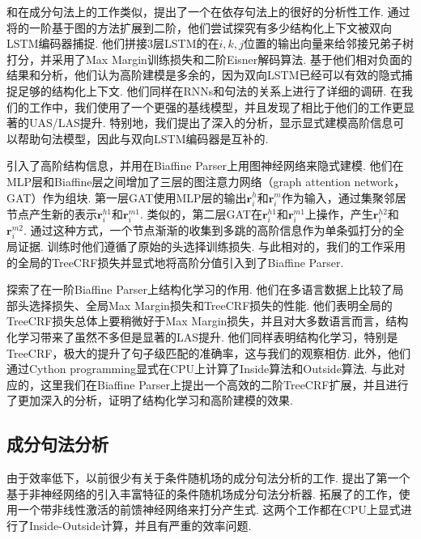 和\citet{gaddy-etal-2018-whats}在成分句法上的工作类似，\citet{falenska-kuhn-2019-non}提出了一个在依存句法上的很好的分析性工作.
通过将\citet{kiperwasser-goldberg-2016-simple}的一阶基于图的方法扩展到二阶，他们尝试探究有多少结构化上下文被双向LSTM编码器捕捉.
他们拼接3层LSTM的在$i,k,j$位置的输出向量来给邻接兄弟子树打分，并采用了Max Margin训练损失和二阶Eisner解码算法\citep{mcdonald-pereira-2006-online}.
基于他们相对负面的结果和分析，他们认为高阶建模是多余的，因为双向LSTM已经可以有效的隐式捕捉足够的结构化上下文.
他们同样在RNNs和句法的关系上进行了详细的调研.
在我们的工作中，我们使用了一个更强的基线模型，并且发现了相比于他们的工作更显著的UAS/LAS提升.
特别地，我们提出了深入的分析，显示显式建模高阶信息可以帮助句法模型，因此与双向LSTM编码器是互补的.


\citet{ji-etal-2019-graph}引入了高阶结构信息，并用在Biaffine Parser\citep{dozat-etal-2017-biaffine}上用图神经网络来隐式建模.
他们在MLP层和Biaffine层之间增加了三层的图注意力网络（graph attention network，GAT）\citep{velickovic-etal-2018-graph}作为组块.
第一层GAT使用MLP层的输出$\mathbf{r}_i^{h}$和$\mathbf{r}_i^{m}$作为输入，通过集聚邻居节点产生新的表示$\mathbf{r}_i^{h1}$和$\mathbf{r}_i^{m1}$.
类似的，第二层GAT在$\mathbf{r}_i^{h1}$和$\mathbf{r}_i^{m1}$上操作，产生$\mathbf{r}_i^{h2}$和$\mathbf{r}_i^{m2}$.
通过这种方式，一个节点渐渐的收集到多跳的高阶信息作为单条弧打分的全局证据.
训练时他们遵循了原始的头选择训练损失.
与此相对的，我们的工作采用的全局的TreeCRF损失并显式地将高阶分值引入到了Biaffine Parser.

\citet{zhang-etal-2019-empirical}探索了在一阶Biaffine Parser上结构化学习的作用.
他们在多语言数据上比较了局部头选择损失、全局Max Margin损失和TreeCRF损失的性能.
他们表明全局的TreeCRF损失总体上要稍微好于Max Margin损失，并且对大多数语言而言，结构化学习带来了虽然不多但是显著的LAS提升.
他们同样表明结构化学习，特别是TreeCRF，极大的提升了句子级匹配的准确率，这与我们的观察相仿.
此外，他们通过Cython programming显式在CPU上计算了Inside算法和Outside算法.
与此对应的，这里我们在Biaffine Parser上提出一个高效的二阶TreeCRF扩展，并且进行了更加深入的分析，证明了结构化学习和高阶建模的效果.

\subsection{成分句法分析}

由于效率低下，以前很少有关于条件随机场的成分句法分析的工作.
\citet{finkel-etal-2008-efficient}提出了第一个基于非神经网络的引入丰富特征的条件随机场成分句法分析器.
\citet{durrett-klein-2015-neural}拓展了\citet{finkel-etal-2008-efficient}的工作，使用一个带非线性激活的前馈神经网络来打分产生式.
这两个工作都在CPU上显式进行了Inside-Outside计算，并且有严重的效率问题.

